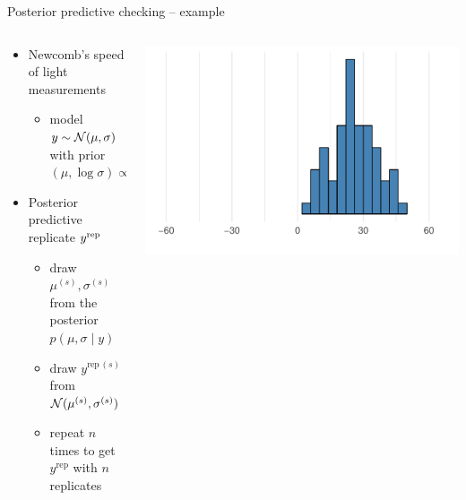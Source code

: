 \documentclass[aspectratio=169]{beamer}
\begin{document}
\begin{frame}[fragile]{Posterior predictive checking -- example}

\begin{columns}
  \begin{column}{.5\textwidth}
  \begin{itemize}
  \item<1-> Newcomb's speed of light measurements
    \begin{itemize}
    \item model $y \sim \mathcal{N}(\mu,\sigma)$ with prior $(\mu,\log\sigma)\propto 1$
    \end{itemize}
    \item<2-> Posterior predictive replicate $y^{\rm rep}$
    \begin{itemize}
    \item<3-> draw $\mu^{(s)},\sigma^{(s)}$ from the posterior $p(\mu,\sigma\mid y)$
    \item<4-> draw $y^{\mathrm{rep}\,(s)}$ from $\mathcal{N}(\mu^{(s)},\sigma^{(s)})$
    \item<5-> repeat $n$ times to get $y^{\mathrm{rep}}$ with $n$ replicates\\~\\
    \end{itemize}
    \end{itemize}
  \end{column}
  
  \begin{column}{.5\textwidth}
  \includegraphics[width=\textwidth]{figures/lap4/light_ppc_1hist.pdf}
  \end{column}
\end{columns}

\end{frame}
\end{document}
